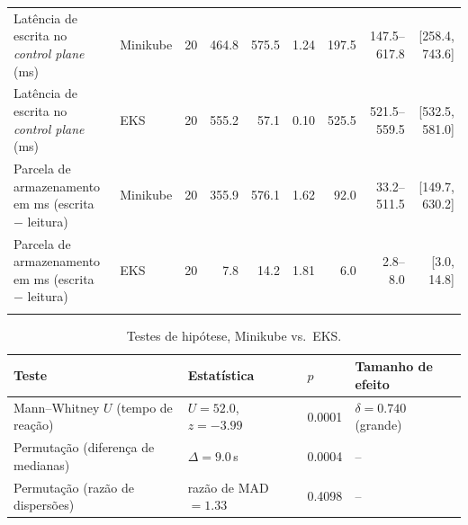 \begin{table}[!t]
\begin{tabular}{@{}llrrrrrrr@{}}
\addlinespace
Latência de escrita no \emph{control plane} (ms) & Minikube & 20 & 464.8 & 575.5 & 1.24 & 197.5 & 147.5--617.8 & [258.4, 743.6]\\
Latência de escrita no \emph{control plane} (ms) & EKS & 20 & 555.2 & 57.1 & 0.10 & 525.5 & 521.5--559.5 & [532.5, 581.0]\\
\addlinespace
Parcela de armazenamento em ms (escrita $-$ leitura) & Minikube & 20 & 355.9 & 576.1 & 1.62 & 92.0 & 33.2--511.5 & [149.7, 630.2]\\
Parcela de armazenamento em ms (escrita $-$ leitura) & EKS & 20 & 7.8 & 14.2 & 1.81 & 6.0 & 2.8--8.0 & [3.0, 14.8]\\
\addlinespace
\bottomrule
\end{tabular}
\end{table}

\begin{table}[!t]
\centering
\caption{Testes de hipótese, Minikube vs.\ EKS.}
\label{tab:testes}
\footnotesize
\begin{tabular}{@{}llll@{}}
\toprule
\textbf{Teste} & \textbf{Estatística} & $p$ & \textbf{Tamanho de efeito}\\
\midrule
Mann--Whitney $U$ (tempo de reação) & $U=52.0$, $z=-3.99$ & 0.0001 & $\delta=0.740$ (grande)\\
Permutação (diferença de medianas) & $\Delta=9.0$\,s & 0.0004 & --\\
Permutação (razão de dispersões) & razão de MAD $=1.33$ & 0.4098 & --\\
\bottomrule
\end{tabular}
\end{table}
